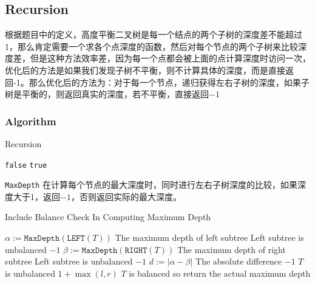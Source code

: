  \subsection{Recursion}
 \begin{CJK*}{UTF8}{gbsn}
根据题目中的定义，高度平衡二叉树是每一个结点的两个子树的深度差不能超过1，那么肯定需要一个求各个点深度的函数，然后对每个节点的两个子树来比较深度差，但是这种方法效率差，因为每一个点都会被上面的点计算深度时访问一次，优化后的方法是如果我们发现子树不平衡，则不计算具体的深度，而是直接返回-1。那么优化后的方法为：对于每一个节点，递归获得左右子树的深度，如果子树是平衡的，则返回真实的深度，若不平衡，直接返回$-1$
\end{CJK*}
\subsubsection{Algorithm}
\setcounter{algorithm}{0}
\begin{algorithm}[H]
\caption{Recursion}
\begin{algorithmic}[1]
\State \Return \texttt{false}
\EndIf
\State \Return \texttt{true}
\EndProcedure
\end{algorithmic}
\end{algorithm}
\begin{CJK*}{UTF8}{gbsn}
\texttt{MaxDepth} 在计算每个节点的最大深度时，同时进行左右子树深度的比较，如果深度大于1，返回$-1$，否则返回实际的最大深度。
\end{CJK*}
\begin{algorithm}[H]
\caption{Include Balance Check In Computing Maximum Depth}
\begin{algorithmic}[1]
\State {}
\EndIf
\State $\alpha:=\texttt{MaxDepth}(\texttt{LEFT}(T))$ \Comment The maximum depth of left subtree
 \Comment Left subtree is unbalanced
\State \Return $-1$
\EndIf
\State $\beta:=\texttt{MaxDepth}(\texttt{RIGHT}(T))$ \Comment The maximum depth of right subtree
 \Comment Left subtree is unbalanced
\State \Return $-1$
\EndIf
\State $d:=|\alpha-\beta|$ \Comment The absolute difference
\State \Return $-1$ \Comment $T$ is unbalanced
\EndIf
\State \Return $1+\max(l, r)$ \Comment $T$ is balanced so return the actual maximum depth
\end{algorithmic}
\end{algorithm}
\begin{algorithm}[H]
\begin{algorithmic}[1]
\EndFunction
\end{algorithmic}
\end{algorithm}